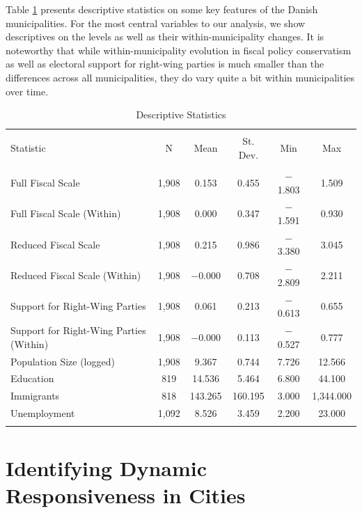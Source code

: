 \documentclass[a4paper,12pt]{article}
\begin{document}
Table \ref{tab:desc} presents descriptive statistics on some key features of the Danish municipalities. For the most central variables to our analysis, we show descriptives on the levels as well as their within-municipality changes. It is noteworthy that while within-municipality evolution in fiscal policy conservatism as well as electoral support for right-wing parties is much smaller than the differences across all municipalities, they do vary quite a bit within municipalities over time.


\begin{table}[!htbp] \centering 
	\caption{Descriptive Statistics} 
	\label{tab:desc} 
		\begin{tabular}{@{\extracolsep{5pt}}lccccc} 
			\\[-1.8ex]\hline 
			\hline \\[-1.8ex] 
			Statistic & \multicolumn{1}{c}{N} & \multicolumn{1}{c}{Mean} & \multicolumn{1}{c}{St. Dev.} & \multicolumn{1}{c}{Min} & \multicolumn{1}{c}{Max} \\ 
			\hline \\[-1.8ex] 
			Full Fiscal Scale & 1,908 & 0.153 & 0.455 & $-$1.803 & 1.509 \\ 
			Full Fiscal Scale (Within) & 1,908 & 0.000 & 0.347 & $-$1.591 & 0.930 \\ 
			Reduced Fiscal Scale & 1,908 & 0.215 & 0.986 & $-$3.380 & 3.045 \\ 
			Reduced Fiscal Scale (Within) & 1,908 & $-$0.000 & 0.708 & $-$2.809 & 2.211 \\ 
			Support for Right-Wing Parties & 1,908 & 0.061 & 0.213 & $-$0.613 & 0.655 \\ 
			Support for Right-Wing Parties (Within) & 1,908 & $-$0.000 & 0.113 & $-$0.527 & 0.777 \\ 
			Population Size (logged) & 1,908 & 9.367 & 0.744 & 7.726 & 12.566 \\ 
			Education & 819 & 14.536 & 5.464 & 6.800 & 44.100 \\ 
			Immigrants & 818 & 143.265 & 160.195 & 3.000 & 1,344.000 \\ 
			Unemployment & 1,092 & 8.526 & 3.459 & 2.200 & 23.000 \\ 
			\hline \\[-1.8ex] 
		\end{tabular} 
\end{table} 



\section*{Identifying Dynamic Responsiveness in Cities}
\end{document}
